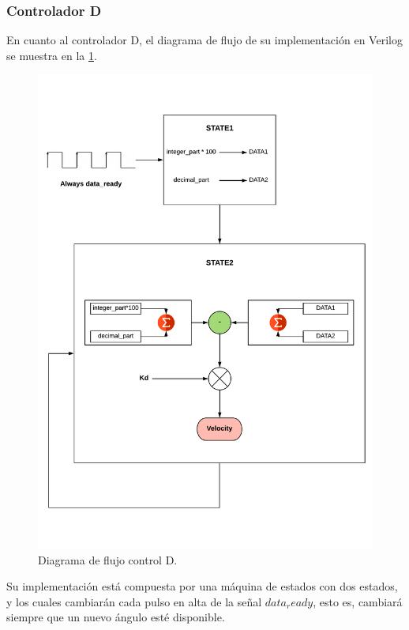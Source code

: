 \subsubsection{Controlador D} \label{sec:ControladorD}

En cuanto al controlador D, el diagrama de flujo de su implementación en Verilog se muestra en la \ref{fig:D_control}. 
	\begin{figure}[H]
	\center
	\includegraphics[trim = 0cm 0cm 0mm 0cm, clip,scale=0.4]{imagenes/Balancing_robot/D.pdf}
	\caption{Diagrama de flujo control D.}
	\label{fig:D_control}
\end{figure}

Su implementación está compuesta por una máquina de estados con dos estados, y los cuales cambiarán cada pulso en alta de la señal $data_ready$, esto es, cambiará siempre que un nuevo ángulo esté disponible.\newline

